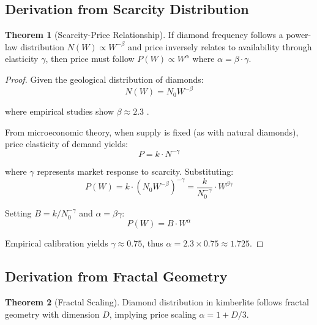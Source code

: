 \documentclass[12pt,a4paper]{article}
\theoremstyle{definition}
\newtheorem{theorem}{Theorem}
\theoremstyle{remark}
\begin{document}
\subsection{Derivation from Scarcity Distribution}

\begin{theorem}[Scarcity-Price Relationship]
If diamond frequency follows a power-law distribution $N(W) \propto W^{-\beta}$ and price inversely relates to availability through elasticity $\gamma$, then price must follow $P(W) \propto W^{\alpha}$ where $\alpha = \beta \cdot \gamma$.
\end{theorem}

\begin{proof}
Given the geological distribution of diamonds:
\begin{equation}
N(W) = N_0 W^{-\beta}
\end{equation}

where empirical studies show $\beta \approx 2.3$ \citep{harlow1998nature}.

From microeconomic theory, when supply is fixed (as with natural diamonds), price elasticity of demand yields:
\begin{equation}
P = k \cdot N^{-\gamma}
\end{equation}

where $\gamma$ represents market response to scarcity. Substituting:
\begin{equation}
P(W) = k \cdot (N_0 W^{-\beta})^{-\gamma} = \frac{k}{N_0^{-\gamma}} \cdot W^{\beta \gamma}
\end{equation}

Setting $B = k/N_0^{-\gamma}$ and $\alpha = \beta \gamma$:
\begin{equation}
P(W) = B \cdot W^{\alpha}
\end{equation}

Empirical calibration yields $\gamma \approx 0.75$, thus $\alpha = 2.3 \times 0.75 \approx 1.725$.
\end{proof}

\subsection{Derivation from Fractal Geometry}

\begin{theorem}[Fractal Scaling]
Diamond distribution in kimberlite follows fractal geometry with dimension $D$, implying price scaling $\alpha = 1 + D/3$.
\end{theorem}
\end{document}

